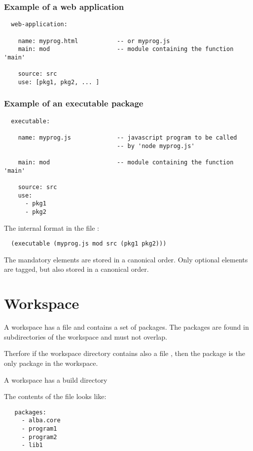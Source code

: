 \subsubsection{ Example of a web application}
{\small
\begin{verbatim}
  web-application:

    name: myprog.html           -- or myprog.js
    main: mod                   -- module containing the function 'main'

    source: src
    use: [pkg1, pkg2, ... ]
\end{verbatim}
}


\subsubsection{ Example of an executable package}
{\small
\begin{verbatim}
  executable:

    name: myprog.js             -- javascript program to be called
                                -- by 'node myprog.js'

    main: mod                   -- module containing the function 'main'

    source: src
    use:
      - pkg1
      - pkg2
\end{verbatim}
}

The internal format in the file :
{\small
\begin{verbatim}
  (executable (myprog.js mod src (pkg1 pkg2)))
\end{verbatim}
}
The mandatory elements are stored in a canonical order. Only optional elements
are tagged, but also stored in a canonical order.





\section{Workspace}

A workspace has a file  and contains a set of
packages. The packages are found in subdirectories of the workspace and must
not overlap.


Therfore if the workspace directory contains also a file
, then the package is the only package in the
workspace.


A workspace has a build directory 

The contents of the file  looks like:
{\small
\begin{verbatim}
   packages:
     - alba.core
     - program1
     - program2
     - lib1
\end{verbatim}
}


